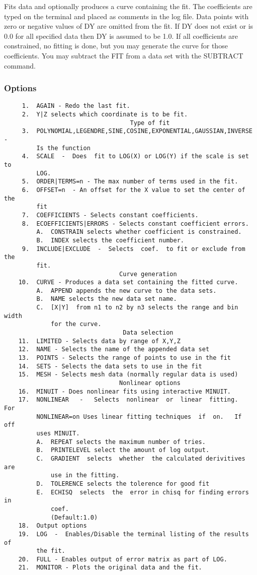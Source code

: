 Fits  data  and  optionally  produces  a  curve  containing the fit.  The
coefficients are typed on the terminal and placed as comments in the  log
file.   Data  points  with zero or negative values of DY are omitted from
the fit.  If DY does not exist or is 0.0 for all specified data  then  DY
is assumed to be 1.0.  If all coefficients are constrained, no fitting is
done, but you may generate the curve for  those  coefficients.   You  may
subtract the FIT from a data set with the SUBTRACT command.  
\subsubsection{Options     }
\begin{verbatim}
     1.  AGAIN - Redo the last fit.  
     2.  Y|Z selects which coordinate is to be fit.  
                                   Type of fit
     3.  POLYNOMIAL,LEGENDRE,SINE,COSINE,EXPONENTIAL,GAUSSIAN,INVERSE -
         Is the function 
     4.  SCALE  -  Does  fit to LOG(X) or LOG(Y) if the scale is set to
         LOG.  
     5.  ORDER|TERMS=n - The max number of terms used in the fit.  
     6.  OFFSET=n  - An offset for the X value to set the center of the
         fit 
     7.  COEFFICIENTS - Selects constant coefficients.  
     8.  ECOEFFICIENTS|ERRORS - Selects constant coefficient errors.  
         A.  CONSTRAIN selects whether coefficient is constrained.  
         B.  INDEX selects the coefficient number.  
     9.  INCLUDE|EXCLUDE  -  Selects  coef.  to fit or exclude from the
         fit.  
                                Curve generation
    10.  CURVE - Produces a data set containing the fitted curve.  
         A.  APPEND appends the new curve to the data sets.  
         B.  NAME selects the new data set name.  
         C.  [X|Y]  from n1 to n2 by n3 selects the range and bin width
             for the curve.  
                                 Data selection
    11.  LIMITED - Selects data by range of X,Y,Z 
    12.  NAME - Selects the name of the appended data set 
    13.  POINTS - Selects the range of points to use in the fit 
    14.  SETS - Selects the data sets to use in the fit 
    15.  MESH - Selects mesh data (normally regular data is used) 
                                Nonlinear options
    16.  MINUIT - Does nonlinear fits using interactive MINUIT.  
    17.  NONLINEAR   -   Selects  nonlinear  or  linear  fitting.   For
         NONLINEAR=on Uses linear fitting techniques  if  on.   If  off
         uses MINUIT.  
         A.  REPEAT selects the maximum number of tries.  
         B.  PRINTELEVEL select the amount of log output.  
         C.  GRADIENT  selects  whether  the calculated derivitives are
             use in the fitting.  
         D.  TOLERENCE selects the tolerence for good fit 
         E.  ECHISQ  selects  the  error in chisq for finding errors in
             coef.  
             (Default:1.0) 
    18.  Output options 
    19.  LOG  -  Enables/Disable the terminal listing of the results of
         the fit.  
    20.  FULL - Enables output of error matrix as part of LOG.  
    21.  MONITOR - Plots the original data and the fit.  
\end{verbatim}

